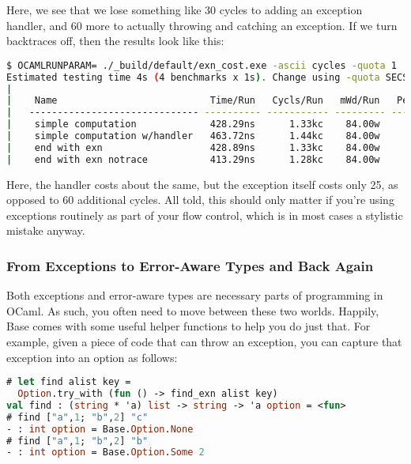 Here, we see that we lose something like 30 cycles to adding an
exception handler, and 60 more to actually throwing and catching an
exception. If we turn backtraces off, then the results look like this:

\begin{lstlisting}[language=bash]
$ OCAMLRUNPARAM= ./_build/default/exn_cost.exe -ascii cycles -quota 1
Estimated testing time 4s (4 benchmarks x 1s). Change using -quota SECS.
|
|    Name                           Time/Run   Cycls/Run   mWd/Run   Percentage
|   ------------------------------ ---------- ----------- --------- ------------
|    simple computation             428.29ns      1.33kc    84.00w       92.36%
|    simple computation w/handler   463.72ns      1.44kc    84.00w      100.00%
|    end with exn                   428.89ns      1.33kc    84.00w       92.49%
|    end with exn notrace           413.29ns      1.28kc    84.00w       89.13%
\end{lstlisting}

Here, the handler costs about the same, but the exception itself costs
only 25, as opposed to 60 additional cycles. All told, this should only
matter if you're using exceptions routinely as part of your flow
control, which is in most cases a stylistic mistake anyway.

\hypertarget{from-exceptions-to-error-aware-types-and-back-again}{%
\subsubsection{From Exceptions to Error-Aware Types and Back
Again}\label{from-exceptions-to-error-aware-types-and-back-again}}

Both exceptions and error-aware types are necessary parts of programming
in OCaml. As such, you often need to move between these two worlds.
Happily, Base comes with some useful helper functions to help you do
just that. For example, given a piece of code that can throw an
exception, you can capture that exception into an option as
follows:

\begin{lstlisting}[language=Caml]
# let find alist key =
  Option.try_with (fun () -> find_exn alist key)
val find : (string * 'a) list -> string -> 'a option = <fun>
# find ["a",1; "b",2] "c"
- : int option = Base.Option.None
# find ["a",1; "b",2] "b"
- : int option = Base.Option.Some 2
\end{lstlisting}

